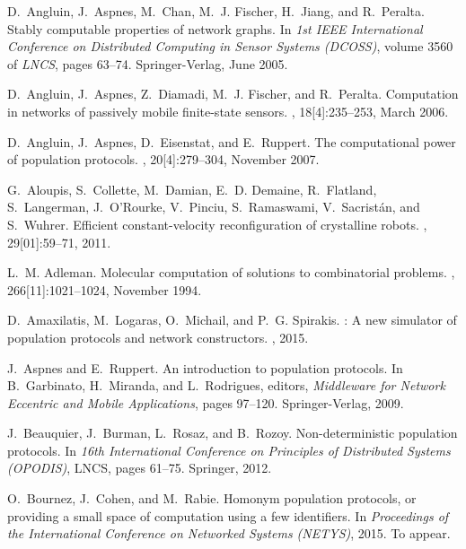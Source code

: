 \documentclass[preprint]{elsarticle}
\begin{document}
\newcommand{\etalchar}[1]{$^{#1}$}
\begin{thebibliography}{CKLWL09}

\bibitem[AAC{\etalchar{+}}05]{AACFJP05}
D.~Angluin, J.~Aspnes, M.~Chan, M.~J. Fischer, H.~Jiang, and R.~Peralta.
\newblock Stably computable properties of network graphs.
\newblock In {\em 1st IEEE International Conference on Distributed Computing in
  Sensor Systems (DCOSS)}, volume 3560 of {\em LNCS}, pages 63--74.
  Springer-Verlag, June 2005.

\bibitem[AAD{\etalchar{+}}06]{AADFP06}
D.~Angluin, J.~Aspnes, Z.~Diamadi, M.~J. Fischer, and R.~Peralta.
\newblock Computation in networks of passively mobile finite-state sensors.
, 18[4]:235--253, March 2006.

D.~Angluin, J.~Aspnes, D.~Eisenstat, and E.~Ruppert.
\newblock The computational power of population protocols.
, 20[4]:279--304, November 2007.

\bibitem[ACD{\etalchar{+}}11]{ACD11}
G.~Aloupis, S.~Collette, M.~Damian, E.~D. Demaine, R.~Flatland, S.~Langerman,
  J.~O'Rourke, V.~Pinciu, S.~Ramaswami, V.~Sacrist{\'a}n, and S.~Wuhrer.
\newblock Efficient constant-velocity reconfiguration of crystalline robots.
, 29[01]:59--71, 2011.

L.~M. Adleman.
\newblock Molecular computation of solutions to combinatorial problems.
, 266[11]:1021--1024, November 1994.

D.~Amaxilatis, M.~Logaras, O.~Michail, and P.~G. Spirakis.
: A new simulator of population protocols and network
  constructors.
, 2015.

J.~Aspnes and E.~Ruppert.
\newblock An introduction to population protocols.
\newblock In B.~Garbinato, H.~Miranda, and L.~Rodrigues, editors, {\em
  Middleware for Network Eccentric and Mobile Applications}, pages 97--120.
  Springer-Verlag, 2009.

J.~Beauquier, J.~Burman, L.~Rosaz, and B.~Rozoy.
\newblock Non-deterministic population protocols.
\newblock In {\em 16th International Conference on Principles of Distributed
  Systems (OPODIS)}, LNCS, pages 61--75. Springer, 2012.

O.~Bournez, J.~Cohen, and M.~Rabie.
\newblock Homonym population protocols, or providing a small space of
  computation using a few identifiers.
\newblock In {\em Proceedings of the International Conference on Networked
  Systems (NETYS)}, 2015.
\newblock To appear.


\end{thebibliography}
\end{document}

